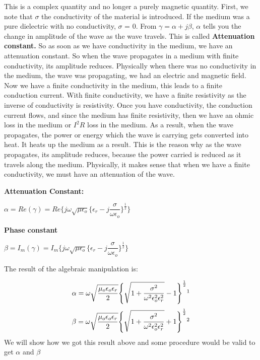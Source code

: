 This is a complex quantity and no longer a purely magnetic quantity. First, we note that $\sigma$ the conductivity of the material is introduced. If the medium was a pure dielectric with no conductivity, $\sigma$ = 0. From $\gamma = \alpha + j\beta$, $\alpha$ tells you the change in amplitude of the wave as the wave travels. This is called \textbf{Attenuation constant.} So as soon as we have conductivity in the medium, we have an attenuation constant. So when the wave propagates in a medium with finite conductivity, its amplitude reduces. Physically when there was no conductivity in the medium, the wave was propagating, we had an electric and magnetic field. Now we have a finite conductivity in the medium, this leads to a finite conduction current. With finite conductivity, we have a finite resistivity as the inverse of conductivity is resistivity. Once you have conductivity, the conduction current flows, and since the medium has finite resistivity, then we have an ohmic loss in the medium or $I^2 R$ loss in the medium. As a result, when the wave propagates, the power or energy which the wave is carrying gets converted into heat. It heats up the medium as a result. This is the reason why as the wave propagates, its amplitude reduces, because the power carried is reduced as it travels along the medium. Physically, it makes sense that when we have a finite conductivity, we must have an attenuation of the wave. 


\textbf{Attenuation Constant:}
\begin{center}
$\alpha = Re(\gamma) = Re\Bigg\{j\omega\sqrt{\mu\epsilon_{o}}\bigg\{\epsilon_{r} - j\dfrac{\sigma}{\omega\epsilon_{o}}\bigg\}^{\frac{1}{2}}\Bigg\}$
\end{center}
\textbf{Phase constant}
\begin{center}
$\beta = I_{m}(\gamma) = I_{m}\Bigg\{j\omega\sqrt{\mu\epsilon_{o}}\bigg\{\epsilon_{r} - j\dfrac{\sigma}{\omega\epsilon_{o}}\bigg\}^{\frac{1}{2}}\Bigg\}$
\end{center}

The result of the algebraic manipulation is:

\begin{equation}
\alpha = \omega\sqrt{\dfrac{\mu_{o}\epsilon_{o}\epsilon_{r}}{2}}\Bigg\{{\sqrt{1 + \dfrac{\sigma^{2}}{\omega^{2}\epsilon_{o}^{2}\epsilon_{r}^{2}}}} - 1\Bigg\}^{\frac{1}{2}}\footnotemark
\end{equation}
\begin{equation}
\beta = \omega\sqrt{\dfrac{\mu_{o}\epsilon_{o}\epsilon_{r}}{2}}\Bigg\{{\sqrt{1 + \dfrac{\sigma^{2}}{\omega^{2}\epsilon_{o}^{2}\epsilon_{r}^{2}}}} + 1\Bigg\}^{\frac{1}{2}}\footnotemark
\end{equation}
We will show how we got this result above and some procedure would be valid to get $\alpha$ and $\beta$


